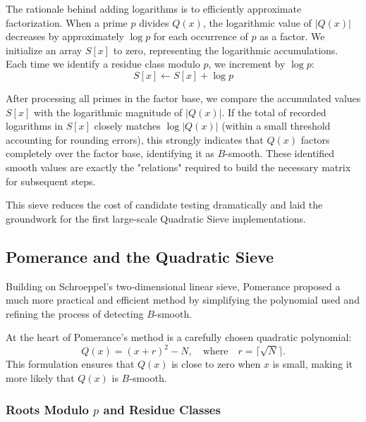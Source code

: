 \documentclass[a4paper, 11pt]{article}
\begin{document}
The rationale behind adding logarithms is to efficiently approximate factorization. When a prime $p$ divides $Q(x)$, the logarithmic value of $|Q(x)|$ decreases by approximately $\log p$ for each occurrence of $p$ as a factor. We initialize an array $S[x]$ to zero, representing the logarithmic accumulations. Each time we identify a residue class modulo $p$, we increment by $\log p$:
\begin{equation}
S[x] \leftarrow S[x] + \log p
\end{equation}

After processing all primes in the factor base, we compare the accumulated values $S[x]$ with the logarithmic magnitude of $|Q(x)|$. If the total of recorded logarithms in $S[x]$ closely matches $\log|Q(x)|$ (within a small threshold accounting for rounding errors), this strongly indicates that $Q(x)$ factors completely over the factor base, identifying it as $B$-smooth. These identified smooth values are exactly the "relations" required to build the necessary matrix for subsequent steps.

This sieve reduces the cost of candidate testing dramatically and laid the groundwork for the first large-scale Quadratic Sieve implementations.

\subsection{Pomerance and the Quadratic Sieve}

Building on Schroeppel's two-dimensional linear sieve, Pomerance proposed a much more practical and efficient method by simplifying the polynomial used and refining the process of detecting $B$-smooth.

At the heart of Pomerance's method is a carefully chosen quadratic polynomial:
\begin{equation}
Q(x) = (x + r)^2 - N, \quad \text{where} \quad r = \bigl\lceil\sqrt{N}\bigr\rceil.
\end{equation}
This formulation ensures that $Q(x)$ is close to zero when $x$ is small, making it more likely that $Q(x)$ is $B$-smooth.

\subsubsection{Roots Modulo $p$ and Residue Classes}
\end{document}
